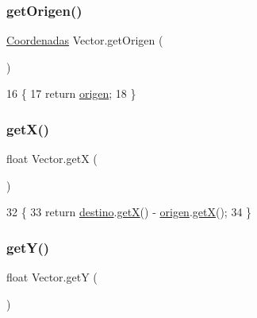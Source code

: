 \subsubsection{\texorpdfstring{get\+Origen()}{getOrigen()}}
{\footnotesize\ttfamily \mbox{\hyperlink{class_coordenadas}{Coordenadas}} Vector.\+get\+Origen (\begin{DoxyParamCaption}{ }\end{DoxyParamCaption})\hspace{0.3cm}{\ttfamily [inline]}}


\begin{DoxyCode}
16                                    \{
17         \textcolor{keywordflow}{return} \mbox{\hyperlink{class_vector_a3c83b7dd875429ec0bb3a799d928bc47}{origen}};
18     \}
\end{DoxyCode}
\mbox{\label{class_vector_a3d9de615137bc20dd4f1d6aa8fefa167}} 
\subsubsection{\texorpdfstring{get\+X()}{getX()}}
{\footnotesize\ttfamily float Vector.\+getX (\begin{DoxyParamCaption}{ }\end{DoxyParamCaption})\hspace{0.3cm}{\ttfamily [inline]}}


\begin{DoxyCode}
32                        \{
33         \textcolor{keywordflow}{return} \mbox{\hyperlink{class_vector_af0a20e915c3efce53463578d8e73948e}{destino}}.\mbox{\hyperlink{class_coordenadas_a7b3fc725f9146220813dc0084fecc3ca}{getX}}() - \mbox{\hyperlink{class_vector_a3c83b7dd875429ec0bb3a799d928bc47}{origen}}.\mbox{\hyperlink{class_coordenadas_a7b3fc725f9146220813dc0084fecc3ca}{getX}}();
34     \}
\end{DoxyCode}
\mbox{\label{class_vector_ac862d32aed23f8ca72176940f76dc1f9}} 
\subsubsection{\texorpdfstring{get\+Y()}{getY()}}
{\footnotesize\ttfamily float Vector.\+getY (\begin{DoxyParamCaption}{ }\end{DoxyParamCaption})\hspace{0.3cm}{\ttfamily [inline]}}


